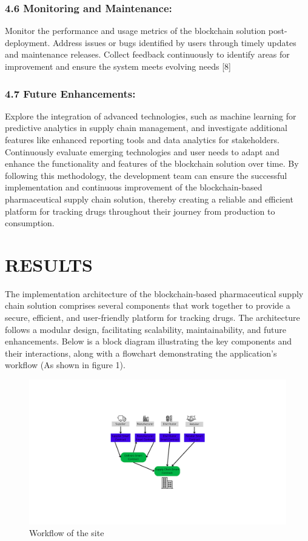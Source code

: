 \documentclass[runningheads]{llncs}
\begin{document}
\subsubsection{4.6 Monitoring	and	Maintenance:}
Monitor the performance and usage metrics of the blockchain solution post-deployment. Address issues or bugs identified by users through timely updates and maintenance releases. Collect feedback continuously to identify areas for improvement and ensure the system meets evolving needs [8]

\subsubsection{4.7 Future Enhancements:}
Explore the integration of advanced technologies, such as machine learning for predictive analytics in supply chain management, and investigate additional features like enhanced reporting tools and data analytics for stakeholders. Continuously evaluate emerging technologies and user needs to adapt and enhance the functionality and features of the blockchain solution over time. By following this methodology, the development team can ensure the successful implementation and continuous improvement of the blockchain-based pharmaceutical supply chain solution, thereby creating a reliable and efficient platform for tracking drugs throughout their journey from production to consumption.

\section{RESULTS}
The implementation architecture of the blockchain-based pharmaceutical supply chain solution comprises several components that work together to provide a secure, efficient, and user-friendly platform for tracking drugs. The architecture follows a modular design, facilitating scalability, maintainability, and future enhancements. Below is a block diagram illustrating the key components and their interactions, along with a flowchart demonstrating the application's workflow (As shown in figure 1).
\begin{figure}
\includegraphics[width=\textwidth]{assets/enhanced_supplier.png}
\caption{Workflow of the site} \label{fig1}
\end{figure}
\end{document}
